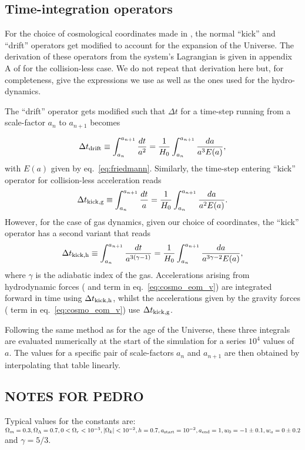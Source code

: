 \subsection{Time-integration operators}
\label{ssec:operators}
For the choice of cosmological coordinates made in \swift, the normal
``kick'' and ``drift'' operators get modified to account for the
expansion of the Universe. The derivation of these operators from the
system's Lagrangian is given in appendix A of \cite{Quinn1997} for the
collision-less case. We do not repeat that derivation here but, for
completeness, give the expressions we use as well as the ones used for
the hydro-dynamics. 

The ``drift'' operator gets modified such that $\Delta t$ for a
time-step running from a scale-factor $a_{n}$ to $a_{n+1}$ becomes

\begin{equation}
  \Delta t_{\rm drift} \equiv \int_{a_n}^{a_{n+1}} \frac{dt}{a^2} = \frac{1}{H_0} \int_{a_n}^{a_{n+1}} \frac{da}{a^3E(a)},
\end{equation}
with $E(a)$ given by eq.~\ref{eq:friedmann}. Similarly, the time-step
entering ``kick'' operator for collision-less acceleration reads
\begin{equation}
  \Delta t_{\rm kick,g} \equiv \int_{a_n}^{a_{n+1}} \frac{dt}{a} = \frac{1}{H_0} \int_{a_n}^{a_{n+1}} \frac{da}{a^2E(a)}.
\end{equation}
However, for the case of gas dynamics, given our choice of
coordinates, the ``kick'' operator has a second variant that reads
\begin{equation}
  \Delta t_{\rm kick,h} \equiv \int_{a_n}^{a_{n+1}} \frac{dt}{a^{3(\gamma-1)}} = \frac{1}{H_0} \int_{a_n}^{a_{n+1}} \frac{da}{a^{3\gamma - 2}E(a)},
\end{equation}
where $\gamma$ is the adiabatic index of the gas.  Accelerations
arising from hydrodynamic forces ( and  term in
eq.~\ref{eq:cosmo_eom_v}) are integrated forward in time using
$\Delta t_{\rm kick,h}$, whilst the accelerations given by the gravity
forces ( term in
eq.~\ref{eq:cosmo_eom_v}) use $\Delta t_{\rm kick,g}$.

Following the same method as for the age of the Universe, these three
integrals are evaluated numerically at the start of the simulation for
a series $10^4$ values of $a$. The values for a specific pair of
scale-factors $a_n$ and $a_{n+1}$ are then obtained by interpolating
that table linearly.



\subsection{NOTES FOR PEDRO}

Typical values for the constants are:
$\Omega_m = 0.3, \Omega_\Lambda=0.7, 0 < \Omega_r<10^{-3}, |\Omega_k | < 10^{-2}, h=0.7, a_{\rm start} = 10^{-2}, a_{\rm end} = 1, w_0 = -1\pm 0.1, w_a=0\pm0.2$ and $\gamma = 5/3$.

